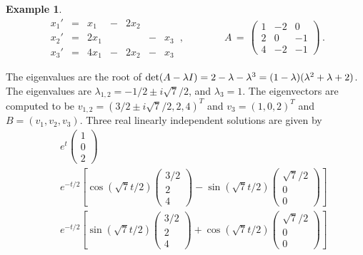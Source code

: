 \documentclass[12pt]{report}
\newtheorem{example}[theorem]{Example}
\begin{document}
\begin{example}{\rm 
\begin{equation}
\begin{array}{ccccccc}
 x_1'   & =&  x_1     & - & 2 x_2 &    &     \\
 x_2'   & =&2x_1    &   &             & - &   x_3  \\
 x_3'   & =&  4x_1      & -  & 2 x_2 &  -  &  x_3  
\end{array} \,, \quad  \quad \quad \quad
A\,=\, \left(\begin{array}{ccc}
1 & -2& 0  \\ 2 & 0 & -1 \\ 4 & -2 &-1 \end{array}
\right)\,.
\end{equation}
}
\end{example}
The eigenvalues are the root of ${\rm det}(A-\lambda I) = 2 -\lambda -
\lambda^3=(1-\lambda)(\lambda^2 +\lambda +2)$. The eigenvalues are
$\lambda_{1,2}= -1/2 \pm i \sqrt{7}/2$, and $\lambda_3=1$.  The
eigenvectors are computed to be $v_{1,2}= (3/2 \pm i \sqrt{7}/2, 2,4)^T$ and 
$v_3= (1,0,2)^T$ and $B=(v_1,v_2,v_3)$.  
Three real  linearly independent 
solutions are given by 
\begin{eqnarray}
&&e^{t} \left( \begin{array}{ccc} 1\\ 0 \\ 2 \end{array} \right) \\
&&e^{-t/2}\left[ \cos( \sqrt{7}t/2) \left( \begin{array}{ccc} 3/2\\ 2
\\ 4 \end{array} \right) - \sin( \sqrt{7}t/2) \left(
\begin{array}{ccc} \sqrt{7}/2\\ 0 \\ 0 \end{array} \right) \right] \\
&&e^{-t/2}\left[ \sin( \sqrt{7}t/2) \left( \begin{array}{ccc} 3/2\\ 2
\\ 4 \end{array} \right) + \cos( \sqrt{7}t/2) \left(
\begin{array}{ccc} \sqrt{7}/2\\ 0 \\ 0 \end{array} \right) \right]
\end{eqnarray}
\end{document}
